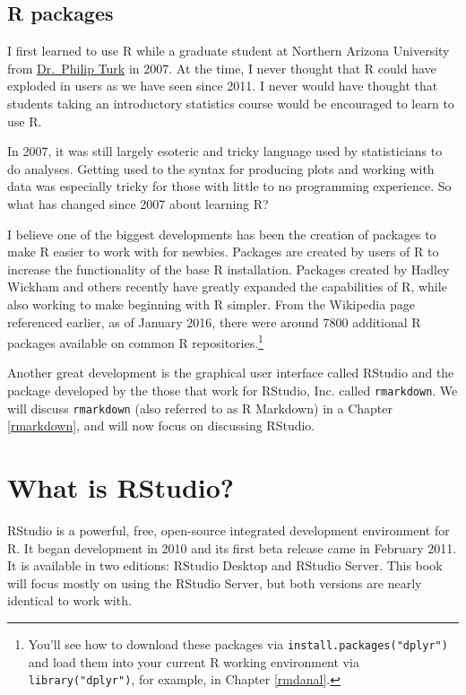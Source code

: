 \documentclass[]{tufte-book}
\begin{document}
\subsection{R packages}\label{r-packages}

I first learned to use R while a graduate student at Northern Arizona
University from \href{http://www.stat.colostate.edu/~pturk/}{Dr.~Philip
Turk} in 2007. At the time, I never thought that R could have exploded
in users as we have seen since 2011. I never would have thought that
students taking an introductory statistics course would be encouraged to
learn to use R.

In 2007, it was still largely esoteric and tricky language used by
statisticians to do analyses. Getting used to the syntax for producing
plots and working with data was especially tricky for those with little
to no programming experience. So what has changed since 2007 about
learning R?

I believe one of the biggest developments has been the creation of
packages to make R easier to work with for newbies. Packages are created
by users of R to increase the functionality of the base R installation.
Packages created by Hadley Wickham and others recently have greatly
expanded the capabilities of R, while also working to make beginning
with R simpler. From the Wikipedia page referenced earlier, as of
January 2016, there were around 7800 additional R packages available on
common R repositories.\footnote{You'll see how to download these
  packages via \texttt{install.packages("dplyr")} and load them into
  your current R working environment via \texttt{library("dplyr")}, for
  example, in Chapter \ref{rmdanal}.}

Another great development is the graphical user interface called RStudio
and the package developed by the those that work for RStudio, Inc.
called \texttt{rmarkdown}. We will discuss \texttt{rmarkdown} (also
referred to as R Markdown) in a Chapter \ref{rmarkdown}, and will now
focus on discussing RStudio.

\section{What is RStudio?}\label{what-is-rstudio}

RStudio is a powerful, free, open-source integrated development
environment for R. It began development in 2010 and its first beta
release came in February 2011. It is available in two editions: RStudio
Desktop and RStudio Server. This book will focus mostly on using the
RStudio Server, but both versions are nearly identical to work with.
\end{document}

